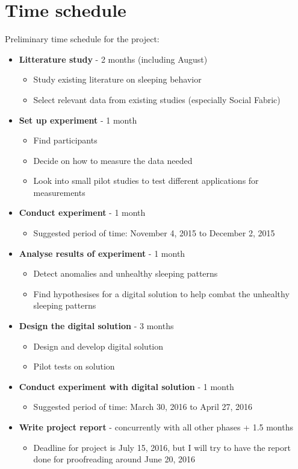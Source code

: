 \documentclass[12pt]{article}
\begin{document}
\section{Time schedule}
Preliminary time schedule for the project:
	\begin{itemize}
		\item \textbf{Litterature study} - 2 months (including August)
			\begin{itemize}
				\item Study existing literature on sleeping behavior
				\item Select relevant data from existing studies (especially Social Fabric)
			\end{itemize}	
		\item \textbf{Set up experiment} - 1 month
			\begin{itemize}
				\item Find participants
				\item Decide on how to measure the data needed
				\item Look into small pilot studies to test different applications for measurements
			\end{itemize}	
		\item \textbf{Conduct experiment} - 1 month
			\begin{itemize}
				\item Suggested period of time: November 4, 2015 to December 2, 2015
			\end{itemize}	
		\item \textbf{Analyse results of experiment} - 1 month
			\begin{itemize}
				\item Detect anomalies and unhealthy sleeping patterns
				\item Find hypothesises for a digital solution to help combat the unhealthy sleeping 
				patterns   
			\end{itemize}	
		\item \textbf{Design the digital solution} - 3 months 
			\begin{itemize}
				\item Design and develop digital solution
				\item Pilot tests on solution 
			\end{itemize}	
		\item \textbf{Conduct experiment with digital solution} - 1 month
			\begin{itemize}
				\item Suggested period of time: March 30, 2016 to April 27, 2016
			\end{itemize}	
		\item \textbf{Write project report} - concurrently with all other phases + 1.5 months
			\begin{itemize}
				\item Deadline for project is July 15, 2016, but I will try to have the report done for proofreading around June 20, 2016 
			\end{itemize}	
	\end{itemize}

%




\end{document}
